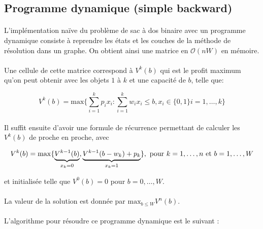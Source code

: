 \documentclass[12pt]{article}
\begin{document}
\subsection{Programme dynamique (simple backward)}

\paragraph{}L'implémentation naïve du problème de sac à dos binaire avec un programme dynamique consiste à reprendre les états et les couches de la méthode de résolution dans un graphe. On obtient ainsi une matrice en $\mathcal{O}(nW)$ en mémoire.

\paragraph{}Une cellule de cette matrice correspond à $V^k (b)$ qui est le profit maximum qu'on peut obtenir avec les objets $1$ à $k$ et une capacité de $b$, telle que:

\[
V^k (b) = \mathrm{max}
\lbrace
\sum_{i=1}^{k}p_i x_i :
\sum_{i=1}^{k}w_i x_i \leq b,
x_i \in \lbrace0,1\rbrace i = 1,\ldots,k
\rbrace
\]

\paragraph{}Il suffit ensuite d'avoir une formule de récurrence permettant de calculer les $V^k (b)$ de proche en proche, avec

\[
V^k (b) = \mathrm{max}
\lbrace
\underbrace{V^{k-1}(b)}_{x_k=0},
\underbrace{V^{k-1}(b-w_k)+p_k}_{x_k=1}
\rbrace
, \textnormal{ pour } k = 1,\ldots,n \textnormal{ et } b = 1,\ldots,W
\]

et initialisée telle que $V^0(b)=0$ pour $b=0,\ldots,W$.

\paragraph{}La valeur de la solution est donnée par $\mathrm{max}_{b\leq W}V^n(b)$.

\paragraph{}L'algorithme pour résoudre ce programme dynamique est le suivant :

\begin{algorithm}[H]
\end{algorithm}
\end{document}
